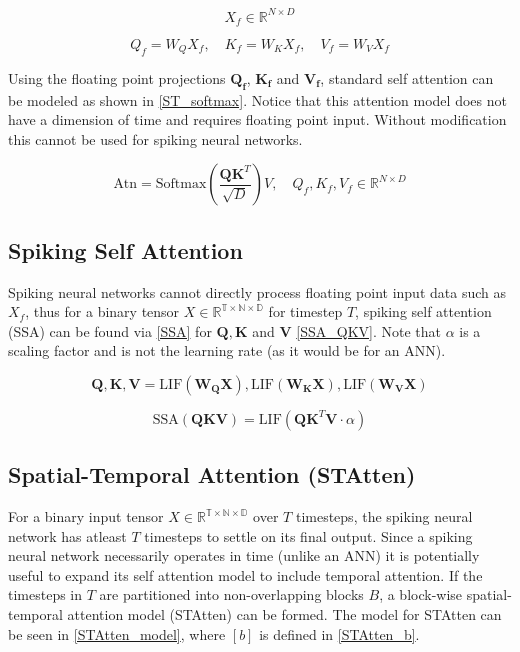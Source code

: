 \documentclass[../main.tex]{subfiles}
\begin{document}
\begin{equation}\label{ST_input_tensor}
X_f\in\mathbb{R}^{N\times D}
\end{equation}

\begin{equation}\label{ST_self_attn}
Q_f=W_Q X_f,\quad K_f=W_K X_f, \quad V_f=W_V X_f
\end{equation}

\par Using the floating point projections $\mathbf{Q_f}$, $\mathbf{K_f}$ and $\mathbf{V_f}$, standard self attention can be modeled as shown in \eqref{ST_softmax}\cite{imageClass}. Notice that this attention model does not have a dimension of time and requires floating point input. Without modification this cannot be used for spiking neural networks.

\begin{equation}\label{ST_softmax}
\text{Atn}=\text{Softmax}\left(\frac{\mathbf{Q}\mathbf{K}^T}{\sqrt{D}}\right)V,\quad Q_f,K_f,V_f\in\mathbb{R}^{N\times D}
\end{equation}

\subsection{Spiking Self Attention}
Spiking neural networks cannot directly process floating point input data such as $X_f$, thus for a binary tensor $X\in\mathbb{R^{T\times N\times D}}$ for timestep $T$, spiking self attention (SSA) can be found via \eqref{SSA} for $\mathbf{Q}, \mathbf{K}$ and $\mathbf{V}$ \eqref{SSA_QKV}. Note that $\alpha$ is a scaling factor and is not the learning rate (as it would be for an ANN).

\begin{equation}\label{SSA_QKV}
\mathbf{Q}, \mathbf{K}, \mathbf{V} = \text{LIF}(\mathbf{W_QX}), \text{LIF}(\mathbf{W_KX}), \text{LIF}(\mathbf{W_VX})
\end{equation}

\begin{equation}\label{SSA}
\text{SSA}(\mathbf{QKV})=\text{LIF}(\mathbf{QK}^T\mathbf{V}\cdot\alpha)
\end{equation}

\subsection{Spatial-Temporal Attention (STAtten)}
For a binary input tensor $X\in\mathbb{R^{T\times N\times D}}$ over $T$ timesteps, the spiking neural network has atleast $T$ timesteps to settle on its final output. Since a spiking neural network necessarily operates in time (unlike an ANN) it is potentially useful to expand its self attention model to include temporal attention. If the timesteps in $T$ are partitioned into non-overlapping blocks $B$, a block-wise spatial-temporal attention model (STAtten) can be formed. The model for STAtten can be seen in \eqref{STAtten_model}, where $[b]$ is defined in \eqref{STAtten_b}\cite{STAtten}.
\end{document}
